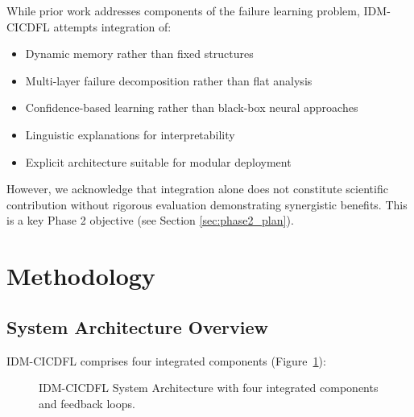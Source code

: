\documentclass[11pt]{article}
\begin{document}
While prior work addresses components of the failure learning problem, IDM-CICDFL attempts integration of:

\begin{itemize}
    \item Dynamic memory rather than fixed structures
    \item Multi-layer failure decomposition rather than flat analysis
    \item Confidence-based learning rather than black-box neural approaches
    \item Linguistic explanations for interpretability
    \item Explicit architecture suitable for modular deployment
\end{itemize}

However, we acknowledge that integration alone does not constitute scientific contribution without rigorous evaluation demonstrating synergistic benefits. This is a key Phase 2 objective (see Section \ref{sec:phase2_plan}).

\section{Methodology}

\subsection{System Architecture Overview}

IDM-CICDFL comprises four integrated components (Figure~\ref{fig:architecture}):

\begin{figure}[h!]
\centering
{}
\caption{IDM-CICDFL System Architecture with four integrated components and feedback loops.}
\label{fig:architecture}
\end{figure}
\end{document}
